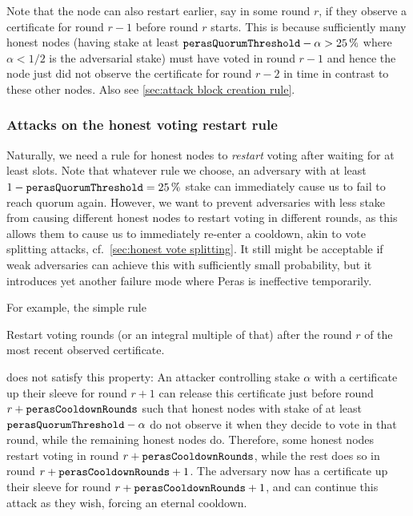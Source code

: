 Note that the node can also restart earlier, say in some round $r$, if they observe a certificate for round $r-1$ before round $r$ starts.
This is because sufficiently many honest nodes (having stake at least $\mathtt{perasQuorumThreshold} - \alpha > \qty{25}{\percent}$ where $\alpha<1/2$ is the adversarial stake) must have voted in round $r-1$ and hence the node just did not observe the certificate for round $r-2$ in time in contrast to these other nodes.
Also see \cref{sec:attack block creation rule}.

\subsubsection{Attacks on the honest voting restart rule}

Naturally, we need a rule for honest nodes to \emph{restart} voting after waiting for at least \Theal{} slots.
Note that whatever rule we choose, an adversary with at least $1-\mathtt{perasQuorumThreshold} = \qty{25}{\percent}$ stake can immediately cause us to fail to reach quorum again.
However, we want to prevent adversaries with less stake from causing different honest nodes to restart voting in different rounds, as this allows them to cause us to immediately re-enter a cooldown, akin to vote splitting attacks, cf.~\cref{sec:honest vote splitting}.
It still might be acceptable if weak adversaries can achieve this with sufficiently small probability, but it introduces yet another failure mode where Peras is ineffective temporarily.

For example, the simple rule
\begin{tcolorbox}
  Restart voting \perasCooldownRounds{} rounds (or an integral multiple of that) after the round $r$ of the most recent observed certificate.
\end{tcolorbox}
\parindent0pt
does not satisfy this property:
An attacker controlling stake $\alpha$ with a certificate up their sleeve for round $r+1$ can release this certificate just before round $r+\mathtt{perasCooldownRounds}$ such that honest nodes with stake of at least $\mathtt{perasQuorumThreshold} - \alpha$ do not observe it when they decide to vote in that round, while the remaining honest nodes do.
Therefore, some honest nodes restart voting in round $r+\mathtt{perasCooldownRounds}$, while the rest does so in round $r+\mathtt{perasCooldownRounds}+1$.
The adversary now has a certificate up their sleeve for round $r+\mathtt{perasCooldownRounds}+1$, and can continue this attack as they wish, forcing an eternal cooldown.

